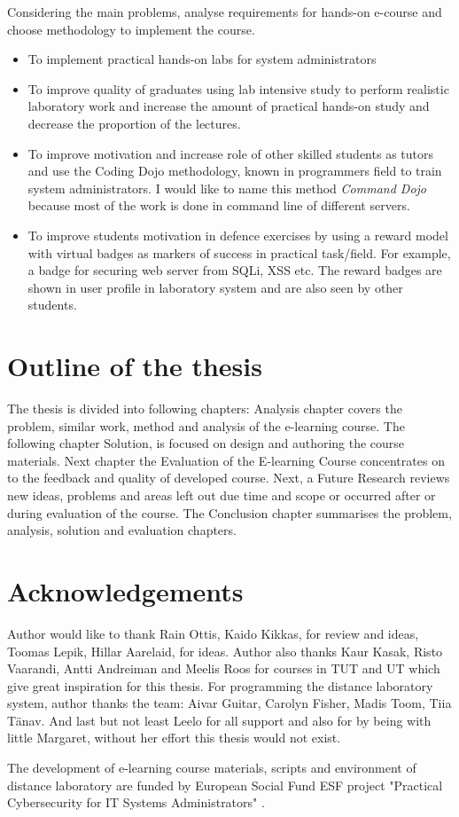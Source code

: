Considering the main problems, analyse requirements for hands-on e-course and choose methodology to implement the course.


\begin{itemize}
\item To implement practical hands-on labs for system administrators
\item To improve quality of graduates using lab intensive study  to perform realistic laboratory work and increase the amount of practical hands-on study and decrease the proportion of the lectures.
\item To improve motivation and increase role of other skilled students as tutors and use the \gls{Coding Dojo} methodology, known in programmers field to train system administrators. I would like to name this method  \emph{Command Dojo} because most of the work is done in command line of different servers.
\item To improve students motivation in defence exercises by using a reward model with virtual badges as markers of success in practical task/field. For example, a badge for securing web server from \gls{SQLi}, \gls{XSS} etc. The reward badges are shown in user profile in laboratory system and are also seen by other students.
\end{itemize}
\par


\section{Outline of the thesis}
The thesis is divided into following chapters: Analysis chapter covers the problem, similar work, method and analysis of the e-learning course. The following chapter Solution, is focused on design and authoring the course materials. Next chapter the Evaluation of the E-learning Course concentrates on to the feedback and quality of developed course. Next, a Future Research reviews new ideas, problems and areas left out due time and scope or occurred after or during evaluation of the course. The Conclusion chapter summarises the problem, analysis, solution and evaluation chapters.



\section{Acknowledgements}
Author would like to thank Rain Ottis, Kaido Kikkas, for review and ideas, Toomas Lepik, Hillar Aarelaid, for ideas. Author also thanks Kaur Kasak, Risto Vaarandi, Antti Andreiman and Meelis Roos for courses in TUT and UT which give great inspiration for this thesis. For programming the distance laboratory system, author thanks the team: Aivar Guitar, Carolyn Fisher, Madis Toom, Tiia Tänav. And last but not least Leelo for all support and also for by being with little Margaret, without her effort this thesis would not exist.

The development of e-learning course materials, scripts and environment of distance laboratory are funded by European Social Fund \gls{ESF} project "Practical Cybersecurity for IT Systems Administrators" \citep{website:ESF_project}.


